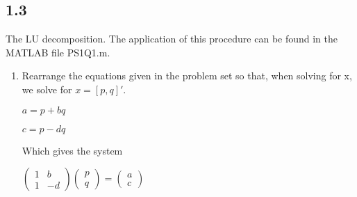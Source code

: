 \documentclass{article}
\begin{document}
\subsection{1.3}
The LU decomposition. The application of this procedure can be found in the MATLAB file PS1Q1.m.\\
\begin{enumerate}
\item Rearrange the equations given in the problem set so that, when solving for x, we solve for $x = [p, q]'$.
\begin{center}$a= p+bq $ \end{center} \begin{center}$ c=p-dq$ \end{center}
Which gives the system

\begin{center}$ \begin{pmatrix}
  1 & b  \\
  1 & -d 
 \end{pmatrix}
 \begin{pmatrix}
  p \\
  q 
 \end{pmatrix}
 =
  \begin{pmatrix}
  a \\
  c 
 \end{pmatrix}$\end{center}


\end{enumerate}
\end{document}
